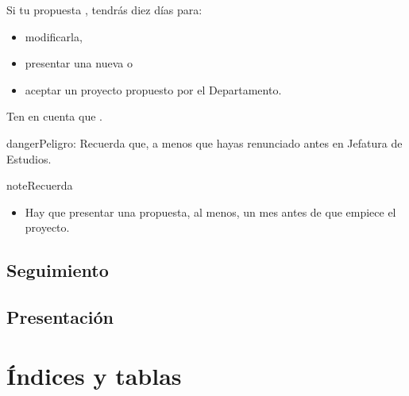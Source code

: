 \documentclass[a4paper,12pt,spanish]{sphinxmanual}
\begin{document}
Si tu propuesta , tendrás diez días para:
\begin{itemize}
\item {} 
modificarla,

\item {} 
presentar una nueva o

\item {} 
aceptar un proyecto propuesto por el Departamento.

\end{itemize}

Ten en cuenta que .

\begin{sphinxadmonition}{danger}{Peligro:}
Recuerda que,  a menos que
hayas renunciado antes en Jefatura de Estudios.
\end{sphinxadmonition}

\begin{sphinxadmonition}{note}{Recuerda}
\begin{itemize}
\item {} 
Hay que presentar una propuesta, al menos, un mes antes de que empiece el proyecto.

\end{itemize}
\end{sphinxadmonition}


\section{Seguimiento}
\label{\detokenize{fases-de-realizacion:seguimiento}}

\section{Presentación}
\label{\detokenize{fases-de-realizacion:presentacion}}

\chapter{Índices y tablas}
\label{\detokenize{index_latex:indices-y-tablas}}


\renewcommand{\indexname}{Índice}
\printindex
\end{document}
